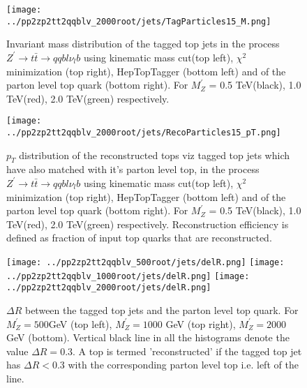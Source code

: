 \documentclass[12pt,a4paper]{article}		%
\begin{document}
\newpage 

\begin{figure}[h]
	\begin{centering}	
		\texttt{[image: ../pp2zp2tt2qqblv\_2000root/jets/TagParticles15\_M.png]} 
		\caption{ Invariant mass distribution of the tagged top jets in the process  $Z^\prime \to t \bar{t} \to qqbl\nu_{l}b$ using kinematic mass cut(top left), $\chi^2$ minimization (top right), HepTopTagger (bottom left) and of the parton level top quark (bottom right). For $M_Z^\prime$ = 0.5 TeV(black), 1.0 TeV(red), 2.0 TeV(green)  respectively. }
		\label{topm}
		\centering
	\end{centering} 		
\end{figure}

\begin{figure}[h]
	\begin{centering}	
		\texttt{[image: ../pp2zp2tt2qqblv\_2000root/jets/RecoParticles15\_pT.png]} 
		\caption{ $p_T$ distribution of the reconstructed tops viz tagged top jets which have also matched with it's parton level top, in the process  $Z^\prime \to t \bar{t} \to qqbl\nu_{l}b$ using kinematic mass cut(top left), $\chi^2$ minimization (top right), HepTopTagger (bottom left) and of the parton level top quark (bottom right). For $M_Z^\prime$ = 0.5 TeV(black), 1.0 TeV(red), 2.0 TeV(green)  respectively. Reconstruction efficiency is defined as fraction of input top quarks that are reconstructed. }
		\label{toppt}
		\centering
	\end{centering} 		
\end{figure}   
\newpage

\begin{figure}[h]
	\begin{centering}	
		\texttt{[image: ../pp2zp2tt2qqblv\_500root/jets/delR.png]} 
		\texttt{[image: ../pp2zp2tt2qqblv\_1000root/jets/delR.png]} 
		\texttt{[image: ../pp2zp2tt2qqblv\_2000root/jets/delR.png]}
		\caption{ $\Delta R$ between the tagged top jets and the parton level top quark. For $M_Z^\prime = 500$GeV (top left), $M_Z^\prime = 1000$ GeV (top right), $M_Z^\prime = 2000$ GeV (bottom). Vertical black line in all the histograms denote the value $\Delta R = 0.3$. A top is termed 'reconstructed' if the tagged top jet has $\Delta R < 0.3$  with the corresponding parton level top i.e. left of the line.}
		\label{delR}
		\centering
	\end{centering} 		
\end{figure}   
\end{document}
